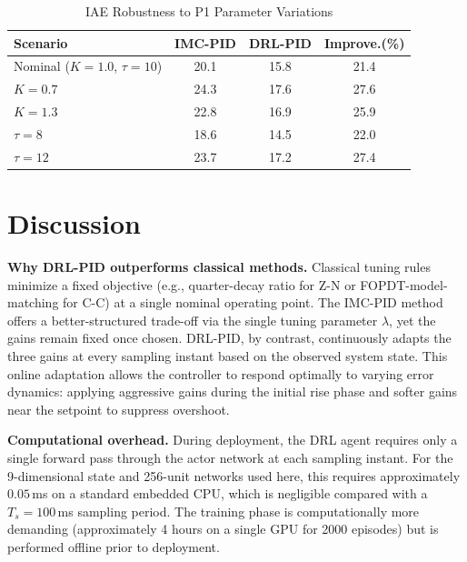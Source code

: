 \documentclass[conference,a4paper]{IEEEtran}[2015/08/26]
\begin{document}
\begin{table}[t]
  \caption{IAE Robustness to P1 Parameter Variations}
  \label{tab:robustness}
  \centering
  \begin{tabular}{l
                  S[table-format=2.1]
                  S[table-format=2.1]
                  S[table-format=2.1]}
    \toprule
    \textbf{Scenario}
      & {\textbf{IMC-PID}} & {\textbf{DRL-PID}} & {\textbf{Improve.(\%)}} \\
    \midrule
    Nominal ($K=1.0$, $\tau=10$) & 20.1 & 15.8 & 21.4 \\
    $K = 0.7$                    & 24.3 & 17.6 & 27.6 \\
    $K = 1.3$                    & 22.8 & 16.9 & 25.9 \\
    $\tau = 8$                   & 18.6 & 14.5 & 22.0 \\
    $\tau = 12$                  & 23.7 & 17.2 & 27.4 \\
    \bottomrule
  \end{tabular}
\end{table}

\section{Discussion}
\label{sec:discussion}

\textbf{Why DRL-PID outperforms classical methods.}
Classical tuning rules minimize a fixed objective (e.g., quarter-decay
ratio for Z-N or FOPDT-model-matching for C-C) at a single nominal
operating point. The IMC-PID method offers a better-structured trade-off
via the single tuning parameter $\lambda$, yet the gains remain fixed
once chosen. DRL-PID, by contrast, continuously adapts the three gains
at every sampling instant based on the observed system state. This
online adaptation allows the controller to respond optimally to
varying error dynamics: applying aggressive gains during the initial
rise phase and softer gains near the setpoint to suppress overshoot.

\textbf{Computational overhead.}
During deployment, the DRL agent requires only a single forward pass
through the actor network at each sampling instant. For the 9-dimensional
state and 256-unit networks used here, this requires approximately
$0.05\,$ms on a standard embedded CPU, which is negligible compared
with a $T_s = 100\,$ms sampling period. The training phase is
computationally more demanding (approximately 4 hours on a single GPU
for 2000 episodes) but is performed offline prior to deployment.
\end{document}
